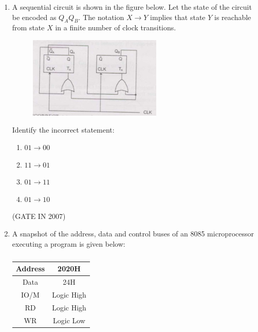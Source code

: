 \documentclass[journal]{IEEEtran}
\begin{document}
\begin{enumerate}
\begin{multicols}{4}
    \begin{enumerate}
      \item $ (\overline{X \oplus Y}) \oplus Z $
      \item $ \overline{\overline{(X \oplus Y)} \oplus Z} $
      \item $ (X \oplus Y) \oplus \overline{Z} $
      \item $ (X \oplus Y) + Z $
    \end{enumerate}
\end{multicols}
\hfill(GATE IN 2007)
\item A sequential circuit is shown in the figure below. Let the state of the circuit be encoded as $Q_AQ_B$. The notation $X \rightarrow Y$ implies that state $Y$ is reachable from state $X$ in a finite number of clock transitions.
\begin{figure}[H]
    \centering
      \includegraphics[width=0.6\textwidth]{39.jpg} 
      \caption{}
    \label{fig:fig39} 
\end{figure}
Identify the incorrect statement:

\begin{multicols}{4}
\begin{enumerate}
    \item $01 \rightarrow 00$
    \item $11 \rightarrow 01$
    \item $01 \rightarrow 11$
    \item $01 \rightarrow 10$
\end{enumerate}
\end{multicols}
\hfill(GATE IN 2007)
\item A snapshot of the address, data and control buses of an 8085 microprocessor executing a program is given below:
\begin{table}[H]
\begin{tabular}{|c|c|}
    \hline
    Address & 2020H \\ \hline
    Data & 24H \\ \hline
     IO/M & Logic High \\ \hline
     RD & Logic High \\ \hline
     WR & Logic Low \\ \hline
\end{tabular}
\caption{}
\label{tab:table 1}
\end{table}


\end{enumerate}
\end{document}
